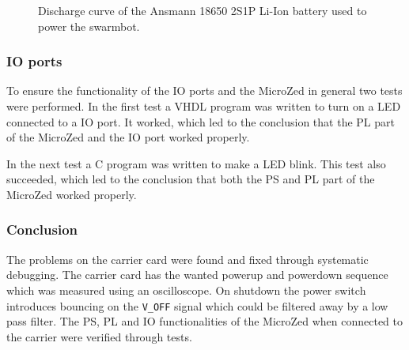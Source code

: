 \begin{figure}[h]
  \centering
  
  \caption{Discharge curve of the Ansmann 18650 2S1P Li-Ion battery used to power the swarmbot.}
  \label{fig:discharge}
\end{figure}

\subsubsection*{IO ports}
To ensure the functionality of the IO ports and the MicroZed in general two tests were performed.
In the first test a VHDL program was written to turn on a LED connected to a IO port. 
It worked, which led to the conclusion that the PL part of the MicroZed and the IO port worked properly.

In the next test a C program was written to make a LED blink.
This test also succeeded, which led to the conclusion that both the PS and PL part of the MicroZed worked properly.

\subsubsection*{Conclusion}
The problems on the carrier card were found and fixed through systematic debugging.
The carrier card has the wanted powerup and powerdown sequence which was measured using an oscilloscope. 
On shutdown the power switch introduces bouncing on the \texttt{V\_OFF} signal which could be filtered away by a low pass filter.
The PS, PL and IO functionalities of the MicroZed when connected to the carrier were verified through tests.
